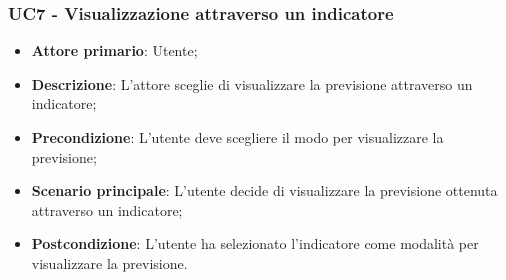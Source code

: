 \subsubsection{UC7 - Visualizzazione attraverso un indicatore}
\label{sssec:uc7}
\begin{itemize}
  \item \textbf{Attore primario}: Utente;
  \item \textbf{Descrizione}: L'attore sceglie di visualizzare la previsione attraverso un indicatore;
  \item \textbf{Precondizione}: L'utente deve scegliere il modo per visualizzare la previsione;
  \item \textbf{Scenario principale}: L'utente decide di visualizzare la previsione ottenuta attraverso un indicatore;
  \item \textbf{Postcondizione}: L'utente ha selezionato l'indicatore come modalità per visualizzare la previsione.
\end{itemize}
